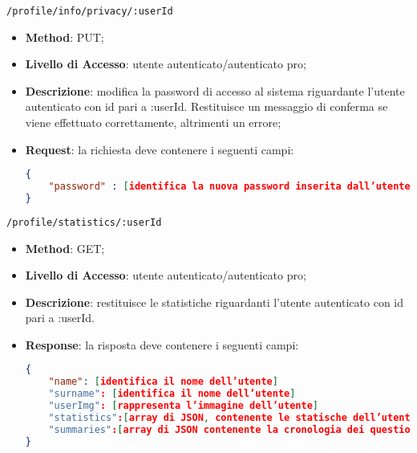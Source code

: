 	\item \texttt{/profile/info/privacy/:userId}
		\begin{itemize}
			\item \textbf{Method}: PUT;
			\item \textbf{Livello di Accesso}: utente autenticato/autenticato pro;
			\item \textbf{Descrizione}: modifica la password di accesso al sistema riguardante l'utente autenticato con id pari a :userId. Restituisce un messaggio di conferma se viene effettuato correttamente, altrimenti un errore;
			\item \textbf{Request}: la richiesta deve contenere i seguenti campi:	
\begin{lstlisting}[language=json,firstnumber=1]
{
    "password" : [identifica la nuova password inserita dall’utente]
}	

\end{lstlisting}
		\end{itemize}
		
	\item \texttt{/profile/statistics/:userId}
		\begin{itemize}
			\item \textbf{Method}: GET;
			\item \textbf{Livello di Accesso}: utente autenticato/autenticato pro;
			\item \textbf{Descrizione}: restituisce le statistiche riguardanti l'utente autenticato con id pari a :userId. 
			\item \textbf{Response}: la risposta deve contenere i seguenti campi:	
\begin{lstlisting}[language=json,firstnumber=1]
{
    "name": [identifica il nome dell’utente]
    "surname": [identifica il nome dell’utente]
    "userImg": [rappresenta l’immagine dell’utente]
	"statistics":[array di JSON, contenente le statische dell’utente di ogni argomento]
	"summaries":[array di JSON contenente la cronologia dei questionari svolti dall’utente]   
}	

\end{lstlisting}
		\end{itemize}
	
